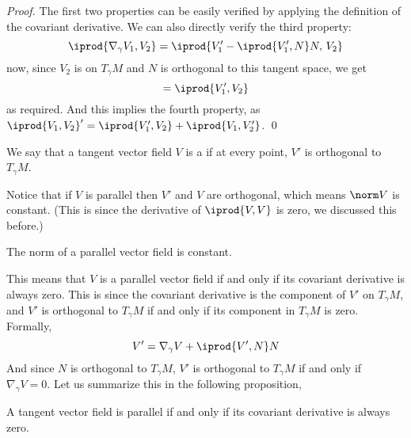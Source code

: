 \begin{proof}

    The first two properties can be easily verified by applying the definition of the covariant derivative.
    We can also directly verify the third property:
    \[ \iprod{\nabla_\gamma V_1,V_2} = \iprod{V'_1-\iprod{V_1',N}N,\,V_2} \]
    now, since $V_2$ is on $T_\gamma M$ and $N$ is orthogonal to this tangent space, we get
    \[ = \iprod{V'_1,V_2} \]
    as required.
    And this implies the fourth property, as $\iprod{V_1,V_2}'=\iprod{V_1',V_2}+\iprod{V_1,V'_2}$.
    \qed

\end{proof}

\begin{defn*}

    We say that a tangent vector field $V$ is a  if at every point, $V'$ is orthogonal to $T_\gamma M$.

\end{defn*}

Notice that if $V$ is parallel then $V'$ and $V$ are orthogonal, which means $\norm V$ is constant.
(This is since the derivative of $\iprod{V,V}$ is zero, we discussed this before.)

\begin{prop*}

    The norm of a parallel vector field is constant.

\end{prop*}

This means that $V$ is a parallel vector field if and only if its covariant derivative is always zero.
This is since the covariant derivative is the component of $V'$ on $T_\gamma M$, and $V'$ is orthogonal to $T_\gamma M$ if and only if its component in $T_\gamma M$ is zero.
Formally,
\[ V' = \nabla_\gamma V + \iprod{V',N}N \]
And since $N$ is orthogonal to $T_\gamma M$, $V'$ is orthogonal to $T_\gamma M$ if and only if $\nabla_\gamma V=0$.
Let us summarize this in the following proposition,

\begin{prop*}

    A tangent vector field is parallel if and only if its covariant derivative is always zero.

\end{prop*}


